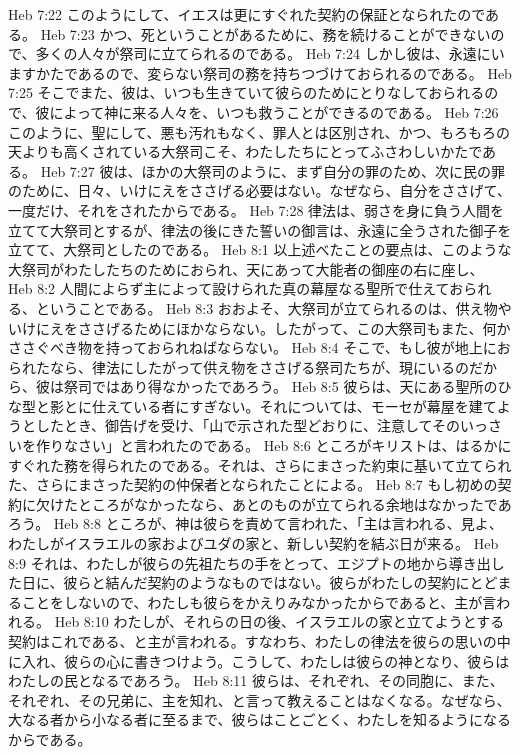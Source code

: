 Heb 7:22  このようにして、イエスは更にすぐれた契約の保証となられたのである。
Heb 7:23  かつ、死ということがあるために、務を続けることができないので、多くの人々が祭司に立てられるのである。
Heb 7:24  しかし彼は、永遠にいますかたであるので、変らない祭司の務を持ちつづけておられるのである。
Heb 7:25  そこでまた、彼は、いつも生きていて彼らのためにとりなしておられるので、彼によって神に来る人々を、いつも救うことができるのである。
Heb 7:26  このように、聖にして、悪も汚れもなく、罪人とは区別され、かつ、もろもろの天よりも高くされている大祭司こそ、わたしたちにとってふさわしいかたである。
Heb 7:27  彼は、ほかの大祭司のように、まず自分の罪のため、次に民の罪のために、日々、いけにえをささげる必要はない。なぜなら、自分をささげて、一度だけ、それをされたからである。
Heb 7:28  律法は、弱さを身に負う人間を立てて大祭司とするが、律法の後にきた誓いの御言は、永遠に全うされた御子を立てて、大祭司としたのである。
Heb 8:1  以上述べたことの要点は、このような大祭司がわたしたちのためにおられ、天にあって大能者の御座の右に座し、
Heb 8:2  人間によらず主によって設けられた真の幕屋なる聖所で仕えておられる、ということである。
Heb 8:3  おおよそ、大祭司が立てられるのは、供え物やいけにえをささげるためにほかならない。したがって、この大祭司もまた、何かささぐべき物を持っておられねばならない。
Heb 8:4  そこで、もし彼が地上におられたなら、律法にしたがって供え物をささげる祭司たちが、現にいるのだから、彼は祭司ではあり得なかったであろう。
Heb 8:5  彼らは、天にある聖所のひな型と影とに仕えている者にすぎない。それについては、モーセが幕屋を建てようとしたとき、御告げを受け、「山で示された型どおりに、注意してそのいっさいを作りなさい」と言われたのである。
Heb 8:6  ところがキリストは、はるかにすぐれた務を得られたのである。それは、さらにまさった約束に基いて立てられた、さらにまさった契約の仲保者となられたことによる。
Heb 8:7  もし初めの契約に欠けたところがなかったなら、あとのものが立てられる余地はなかったであろう。
Heb 8:8  ところが、神は彼らを責めて言われた、「主は言われる、見よ、わたしがイスラエルの家およびユダの家と、新しい契約を結ぶ日が来る。
Heb 8:9  それは、わたしが彼らの先祖たちの手をとって、エジプトの地から導き出した日に、彼らと結んだ契約のようなものではない。彼らがわたしの契約にとどまることをしないので、わたしも彼らをかえりみなかったからであると、主が言われる。
Heb 8:10  わたしが、それらの日の後、イスラエルの家と立てようとする契約はこれである、と主が言われる。すなわち、わたしの律法を彼らの思いの中に入れ、彼らの心に書きつけよう。こうして、わたしは彼らの神となり、彼らはわたしの民となるであろう。
Heb 8:11  彼らは、それぞれ、その同胞に、また、それぞれ、その兄弟に、主を知れ、と言って教えることはなくなる。なぜなら、大なる者から小なる者に至るまで、彼らはことごとく、わたしを知るようになるからである。
